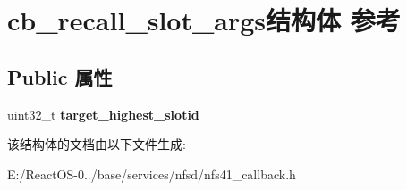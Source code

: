 \hypertarget{structcb__recall__slot__args}{}\section{cb\+\_\+recall\+\_\+slot\+\_\+args结构体 参考}
\label{structcb__recall__slot__args}
\subsection*{Public 属性}
\begin{DoxyCompactItemize}
\item 
\mbox{\label{structcb__recall__slot__args_a6833fd40daab801a6ae9804c66894c1b}} 
uint32\+\_\+t {\bfseries target\+\_\+highest\+\_\+slotid}
\end{DoxyCompactItemize}


该结构体的文档由以下文件生成\+:\begin{DoxyCompactItemize}
\item 
E\+:/\+React\+O\+S-\/0../base/services/nfsd/nfs41\+\_\+callback.\+h\end{DoxyCompactItemize}
